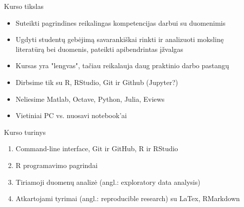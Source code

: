 \documentclass[11pt,xcolor=table]{beamer}
\begin{document}


\begin{frame}{Kurso tikslas}
\begin{itemize}
\item Suteikti pagrindines reikalingas kompetencijas darbui su duomenimis
\item Ugdyti studentų gebėjimą savarankiškai rinkti ir analizuoti mokslinę literatūrą bei duomenis, pateikti apibendrintas įžvalgas
\item Kursas yra "lengvas", tačiau reikalauja daug praktinio darbo pastangų
\item Dirbsime tik su R, RStudio, Git ir Github (Jupyter?)
\item Neliesime Matlab, Octave, Python, Julia, Eviews
\item Vietiniai PC vs. nuosavi notebook'ai
\end{itemize}
\end{frame}



\begin{frame}{Kurso turinys}
\begin{enumerate}
\item Command-line interface,  Git ir GitHub, R ir RStudio
\item R programavimo pagrindai
\item Tiriamoji duomenų analizė (angl.: exploratory data analysis)
\item Atkartojami tyrimai (angl.: reproducible research) su LaTex, RMarkdown
\end{enumerate}
\end{frame}
\end{document}
